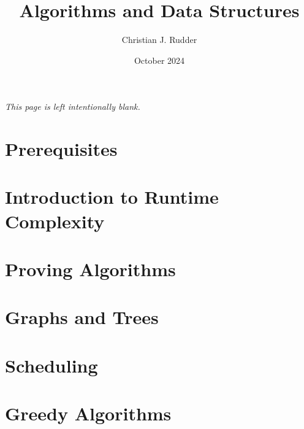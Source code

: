\documentclass{memoir}
\title{Algorithms and Data Structures}
\author{Christian J. Rudder}
\date{October 2024}
\begin{document}
\maketitle
\setcounter{tocdepth}{2}

\tableofcontents

\newpage
\thispagestyle{empty}
\mbox{}
\vfill
\begin{center}
    \textit{This page is left intentionally blank.}
\end{center}
\vfill
\newpage

\chapter*{Prerequisites}

\chapter{Introduction to Runtime Complexity}

\chapter{Proving Algorithms}


\chapter{Graphs and Trees}




\chapter{Scheduling}




\chapter{Greedy Algorithms}


\end{document}
